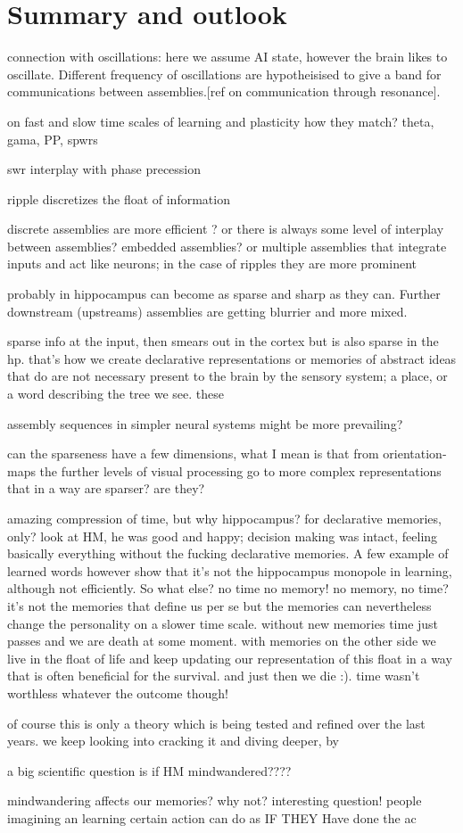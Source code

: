 \chapter{Summary and outlook}

connection with oscillations:
here we assume AI state, however the brain likes to oscillate. Different frequency of oscillations are hypotheisised to give a band for communications between assemblies.[ref on communication through resonance]. 

on fast and slow time scales of learning and plasticity how they match? theta, gama, PP, spwrs

swr interplay with phase precession

ripple discretizes the float of information

discrete assemblies are more efficient ? or there is always some level of interplay between assemblies?
embedded assemblies? or multiple assemblies that integrate inputs and act like neurons; in the case of ripples they are more prominent

probably in hippocampus can become as sparse and sharp as they can. Further downstream (upstreams) assemblies are getting blurrier and more mixed.

sparse info at the input, then smears out in the cortex but is also sparse in the hp. that's how we create declarative representations or memories of abstract ideas that do are not necessary present to the brain by the sensory system; a place, or a word describing the tree we see. these 

assembly sequences in simpler neural systems might be more prevailing?

can the sparseness have a few dimensions, what I mean is that from orientation-maps the further levels of visual processing go to more complex representations that in a way are sparser? are they?


amazing compression of time, but why hippocampus? for declarative memories, only? look at HM, he was good and happy; decision making was intact, feeling basically everything without the fucking declarative memories. A few example of learned words however show that it's not the hippocampus monopole in learning, although not efficiently. So what else? no time no memory! no memory, no time? 
it's not the memories that define us per se but the memories can nevertheless change the personality on a slower time scale. without new memories time just passes and we are death at some moment. with memories on the other side we live in the float of life and keep updating our representation of this float in a way that is often beneficial for the survival. and just then we die :). time wasn't worthless whatever the outcome though!

of course this is only a theory which is being tested and refined over the last years. we keep looking into cracking it and diving deeper, by 


a big scientific question is if HM mindwandered????


mindwandering affects our memories? why not? interesting question! people imagining an learning certain action can do as IF THEY Have done the ac


